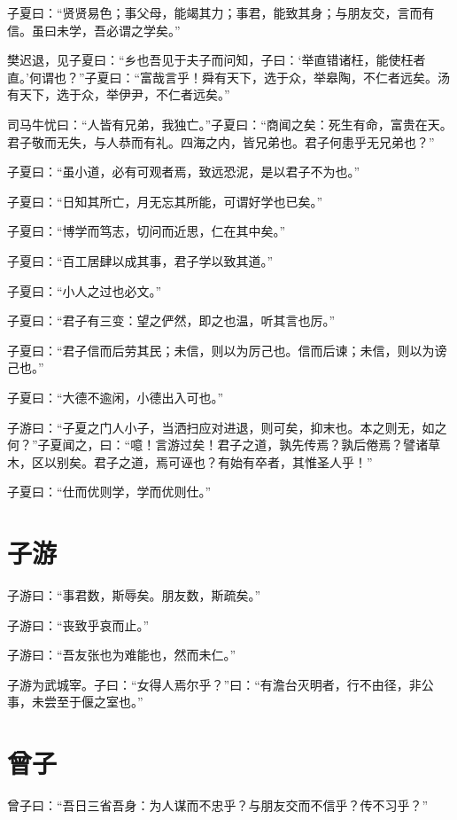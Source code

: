 \documentclass[a5paper]{ctexbook}
\begin{document}
    子夏曰：“贤贤易色；事父母，能竭其力；事君，能致其身；与朋友交，言而有信。虽曰未学，吾必谓之学矣。”

    樊迟退，见子夏曰：“乡也吾见于夫子而问知，子曰：‘举直错诸枉，能使枉者直。’何谓也？”子夏曰：“富哉言乎！舜有天下，选于众，举皋陶，不仁者远矣。汤有天下，选于众，举伊尹，不仁者远矣。”

    司马牛忧曰：“人皆有兄弟，我独亡。”子夏曰：“商闻之矣：死生有命，富贵在天。君子敬而无失，与人恭而有礼。四海之内，皆兄弟也。君子何患乎无兄弟也？”

    子夏曰：“虽小道，必有可观者焉，致远恐泥，是以君子不为也。”
    
    子夏曰：“日知其所亡，月无忘其所能，可谓好学也已矣。”
    
    子夏曰：“博学而笃志，切问而近思，仁在其中矣。”

    子夏曰：“百工居肆以成其事，君子学以致其道。”
    
    子夏曰：“小人之过也必文。”
    
    子夏曰：“君子有三变：望之俨然，即之也温，听其言也厉。”

    子夏曰：“君子信而后劳其民；未信，则以为厉己也。信而后谏；未信，则以为谤己也。”
    
    子夏曰：“大德不逾闲，小德出入可也。”
    
    子游曰：“子夏之门人小子，当洒扫应对进退，则可矣，抑末也。本之则无，如之何？”子夏闻之，曰：“噫！言游过矣！君子之道，孰先传焉？孰后倦焉？譬诸草木，区以别矣。君子之道，焉可诬也？有始有卒者，其惟圣人乎！”

    子夏曰：“仕而优则学，学而优则仕。”

    \chapter{子游}

    子游曰：“事君数，斯辱矣。朋友数，斯疏矣。”

    子游曰：“丧致乎哀而止。”
    
    子游曰：“吾友张也为难能也，然而未仁。”

    子游为武城宰。子曰：“女得人焉尔乎？”曰：“有澹台灭明者，行不由径，非公事，未尝至于偃之室也。”

    \chapter{曾子}

    曾子曰：“吾日三省吾身：为人谋而不忠乎？与朋友交而不信乎？传不习乎？”
\end{document}
